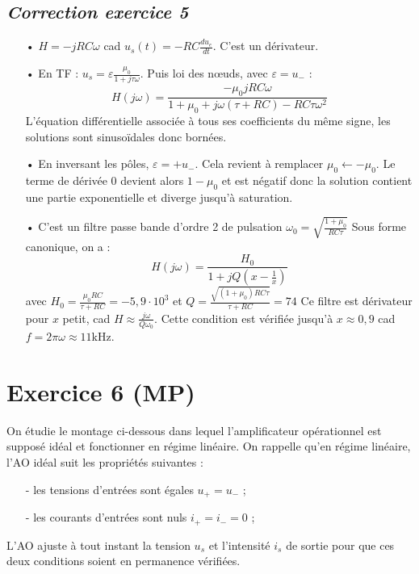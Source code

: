 \documentclass{report}
\begin{document}
\newpage

\subsection*{\textit{Correction exercice 5}}

\begin{itemize}
	\item[•] $H = -jRC\omega$ cad $u_s(t) = -RC\frac{du_e}{dt}$. C'est un dérivateur.
	\item[•] En TF : $u_s = \varepsilon\frac{\mu_0}{1+j\tau\omega}$. Puis loi des nœuds, avec $\varepsilon=u_-$ :
	\begin{equation}
		H(j\omega) = \frac{-\mu_0jRC\omega}{1+\mu_0 + j\omega(\tau+RC)-RC\tau\omega^2}
	\end{equation}
	L'équation différentielle associée à tous ses coefficients du même signe, les solutions sont sinusoïdales donc bornées. 
	\item[•] En inversant les pôles, $\varepsilon=+u_-$. Cela revient à remplacer $\mu_0\leftarrow-\mu_0$. Le terme de dérivée 0 devient alors $1-\mu_0$ et est négatif donc la solution contient une partie exponentielle et diverge jusqu'à saturation.
	\item[•] C'est un filtre passe bande d'ordre 2 de pulsation $\omega_0=\sqrt{\frac{1+\mu_0}{RC\tau}}$
	Sous forme canonique, on a :
		\begin{equation}
		H(j\omega) = \frac{H_0}{1+jQ(x-\frac{1}{x})}
	\end{equation}
	avec $H_0=\frac{\mu_0RC}{\tau+RC}=-5,9\cdot10^3$ et $Q = \frac{\sqrt{(1+\mu_0)RC\tau}}{\tau+RC}=74$
	Ce filtre est dérivateur pour $x$ petit, cad $H\approx \frac{j\omega}{Q\omega_0}$. Cette condition est vérifiée jusqu'à $x\approx0,9$ cad $f=2\pi\omega\approx11$kHz.
\end{itemize}

\newpage

\section*{Exercice 6 (MP)}

On étudie le montage ci-dessous dans lequel l'amplificateur opérationnel est supposé idéal et fonctionner en régime linéaire. On rappelle qu'en régime linéaire, l'AO idéal suit les propriétés suivantes :
\begin{itemize}
	\item[-] les tensions d'entrées sont égales $u_+=u_-$ ;
	\item[-] les courants d'entrées sont nuls $i_+=i_-=0$ ;
\end{itemize}
L'AO ajuste à tout instant la tension $u_s$ et l'intensité $i_s$ de sortie pour que ces deux conditions soient en permanence vérifiées.
\end{document}

